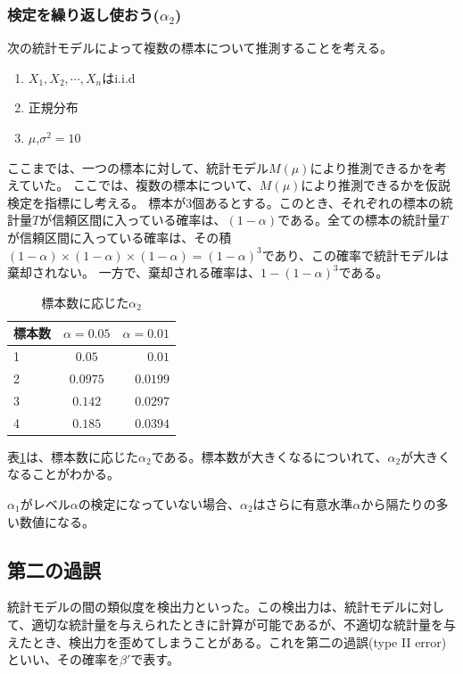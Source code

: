 \subsubsection{検定を繰り返し使おう($\alpha_2$)}
次の統計モデルによって複数の標本について推測することを考える。
\begin{enumerate}
    \item $X_1,X_2,\cdots,X_n $はi.i.d
    \item 正規分布
    \item $\mu$,$\sigma^2=10$
\end{enumerate}
ここまでは、一つの標本に対して、統計モデル$M(\mu)$により推測できるかを考えていた。
ここでは、複数の標本について、$M(\mu)$により推測できるかを仮説検定を指標にし考える。
標本が$3$個あるとする。このとき、それぞれの標本の統計量$T$が信頼区間に入っている確率は、$(1-\alpha)$である。全ての標本の統計量$T$が信頼区間に入っている確率は、その積$(1-\alpha)\times(1-\alpha)\times(1-\alpha)=(1-\alpha)^3$であり、この確率で統計モデルは棄却されない。
一方で、棄却される確率は、$1-(1-\alpha)^3$である。
\begin{table}[hbtp]
    \caption{標本数に応じた$\alpha_2$}
    \label{table:multiple_test_reject_prob}
    \centering
    \begin{tabular}{lcr}
      \hline
      標本数  & $\alpha=0.05$  &  $\alpha=0.01$ \\
      \hline \hline
       1 & $0.05$  & $0.01$ \\
       2 & $0.0975$ & $0.0199$\\
       3 & $0.142$ & $0.0297$\\
       4 & $0.185$ & $0.0394$\\
    \end{tabular}
  \end{table}
表\ref{table:multiple_test_reject_prob}は、標本数に応じた$\alpha_2$である。標本数が大きくなるについれて、$\alpha_2$が大きくなることがわかる。

$\alpha_1$がレベル$\alpha$の検定になっていない場合、$\alpha_2$はさらに有意水準$\alpha$から隔たりの多い数値になる。




\subsection{第二の過誤}
統計モデルの間の類似度を検出力といった。この検出力は、統計モデルに対して、適切な統計量を与えられたときに計算が可能であるが、不適切な統計量を与えたとき、検出力を歪めてしまうことがある。これを第二の過誤(type II error)といい、その確率を$\beta'$で表す。


